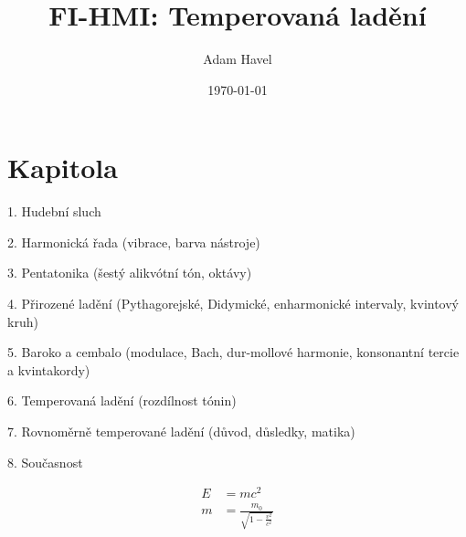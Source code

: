 \documentclass[12pt]{article}
\title{FI-HMI: Temperovaná ladění}
\date{\today}
\author{Adam Havel}
\begin{document}
\maketitle

\section{Kapitola}
1. Hudební sluch

2. Harmonická řada (vibrace, barva nástroje)

3. Pentatonika (šestý alikvótní tón, oktávy)

4. Přirozené ladění (Pythagorejské, Didymické, enharmonické intervaly, kvintový kruh)

5. Baroko a cembalo (modulace, Bach, dur-mollové harmonie, konsonantní tercie a kvintakordy)

6. Temperovaná ladění (rozdílnost tónin)

7. Rovnoměrně temperované ladění (důvod, důsledky, matika)

8. Současnost

\cite{bernstein} \cite{smolka}

\begin{align}
E &= mc^2                              \\
m &= \frac{m_0}{\sqrt{1-\frac{v^2}{c^2}}}
\end{align}

{}

\end{document}
